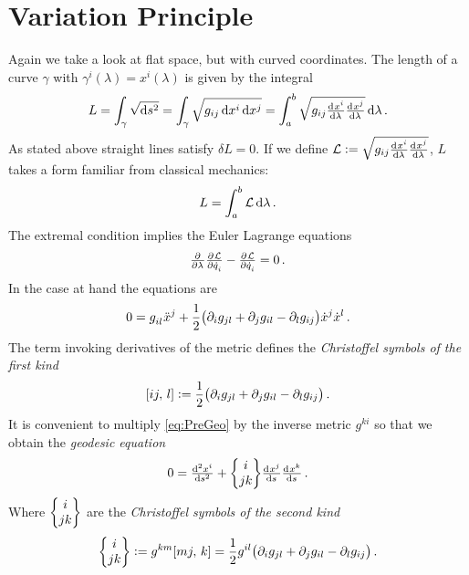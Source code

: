 \section{Variation Principle}
Again we take a look at flat space, but with curved coordinates. 
The length of a curve $\gamma$ with $\gamma^i(\lambda) = x^i(\lambda)$ is given by the integral
\begin{equation}
    L=\int_{\gamma}\sqrt{\dif s^2} = 
    \int_{\gamma}\sqrt{g_{ij}\dif x^i\dif x^j}=\int_{a}^{b}\sqrt{g_{ij}\od{x^i}{\lambda} \od{x^j}{\lambda}}\dif \lambda\, .
\end{equation}
As stated above straight lines satisfy $\delta L = 0$. 
If we define $\mathcal{L}:=\sqrt{g_{ij}\od{x^i}{\lambda} \od{x^j}{\lambda}}$, $L$ takes a form familiar from classical mechanics:
\begin{equation}
    L=\int_a^b \mathcal{L}\dif \lambda\, .
\end{equation}
The extremal condition implies the Euler Lagrange equations
\begin{equation}
    \pd{}{\lambda}\pd{\mathcal{L}}{\dot{q}_i}-\pd{\mathcal{L}}{\dot{q}_i}
=0\, .		\end{equation}
In the case at hand the equations are
\begin{equation}
    0=\tensor{g}{_i_l}\tensor{\ddot{x}}{^j}+\frac{1}{2} \left(\partial_i g_{jl} + \partial_j g_{il} - 
    \partial_l g_{ij}\right)\dot{x}^j\dot{x}^l\, . \label{eq:PreGeo}
\end{equation}
The term invoking derivatives of the metric defines the \emph{Christoffel
symbols of the first kind}
\begin{equation}
    \csym{i}{j}{l}:=\frac{1}{2} \left(\partial_i g_{jl} + \partial_j g_{il} -
    \partial_l g_{ij}\right)\, .
\end{equation}
It is convenient to multiply \eqref{eq:PreGeo} by the inverse metric $g^{ki}$ so that we obtain the \emph{geodesic equation}
\begin{equation}
    0 =
    \od[2]{x^i}{s}+\cSym{i}{j}{k}\od{x^j}{s}\od{x^k}{s}\, .
\end{equation}
Where $\begin{Bmatrix} i \\ j k \end{Bmatrix}$ are the \emph{Christoffel symbols of the second kind}
\begin{equation}
   \cSym{i}{j}{k}:=g^{km}\csym{m}{j}{k}=\frac{1}{2}g^{il}\left(\partial_i
    g_{jl} + \partial_j g_{il} - \partial_l g_{ij}\right)\, .
\end{equation}
